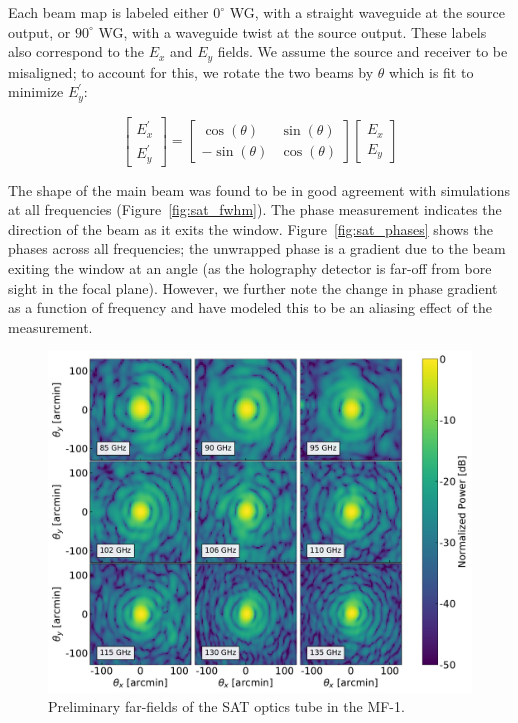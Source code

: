 Each beam map is labeled either $0^{\circ}$ WG, with a straight waveguide at the source output, or $90^{\circ}$ WG, with a waveguide twist at the source output.  These labels also correspond to the $E_x$ and $E_y$ fields.  We assume the source and receiver to be misaligned; to account for this, we rotate the two beams by $\theta$ which is fit to minimize $E_y^{'}$:

\begin{equation}
\begin{bmatrix}
 E_x^{'} \\
 E_y^{'}
 \end{bmatrix} = 
\begin{bmatrix}
 \cos(\theta) & \sin(\theta) \\
 -\sin(\theta) & \cos(\theta)
 \end{bmatrix}
\begin{bmatrix}
 E_x \\
 E_y
 \end{bmatrix}
 \end{equation}
 
The shape of the main beam was found to be in good agreement with simulations at all frequencies (Figure~\ref{fig:sat_fwhm}).  The phase measurement indicates the direction of the beam as it exits the window.  Figure~\ref{fig:sat_phases} shows the phases across all frequencies; the unwrapped phase is a gradient due to the beam exiting the window at an angle (as the holography detector is far-off from bore sight in the focal plane).  However, we further note the change in phase gradient as a function of frequency and have modeled this to be an aliasing effect of the measurement.

 \begin{figure}[t!]
    \centering
    \includegraphics[width = .75\textwidth]{Figures/farfield_sat.pdf}
    \caption{Preliminary far-fields of the SAT optics tube in the MF-1.}
    \label{fig:farfields_sat}
\end{figure}

